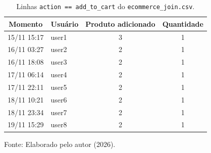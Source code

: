 \begin{table}[H]
  \caption{Linhas \texttt{action == add\_to\_cart} do \texttt{ecommerce\_join.csv}.}
  \label{tab:csv-cart-ap}
  \centering
  \begin{tabular}{c l c c}
    \toprule
    \textbf{Momento} & \textbf{Usuário} & \textbf{Produto adicionado} & \textbf{Quantidade} \\
    \midrule
    15/11 15:17 & user1 & 3 & 1 \\
    16/11 03:27 & user2 & 2 & 1 \\
    16/11 18:08 & user3 & 2 & 1 \\
    17/11 06:14 & user4 & 2 & 1 \\
    17/11 22:11 & user5 & 2 & 1 \\
    18/11 10:21 & user6 & 2 & 1 \\
    18/11 23:34 & user7 & 2 & 1 \\
    19/11 15:29 & user8 & 2 & 1 \\
    \bottomrule
  \end{tabular}
  \par\vspace{4pt}
  {\footnotesize Fonte: Elaborado pelo autor (2026).}
\end{table}
